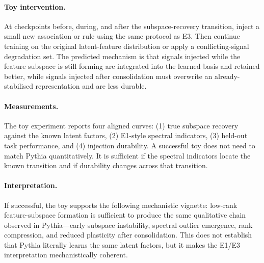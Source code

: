 \paragraph{Toy intervention.}
At checkpoints before, during, and after the subspace-recovery transition, inject a small new association or rule using the same protocol as E3. Then continue training on the original latent-feature distribution or apply a conflicting-signal degradation set. The predicted mechanism is that signals injected while the feature subspace is still forming are integrated into the learned basis and retained better, while signals injected after consolidation must overwrite an already-stabilised representation and are less durable.

\paragraph{Measurements.}
The toy experiment reports four aligned curves: (1) true subspace recovery against the known latent factors, (2) E1-style spectral indicators, (3) held-out task performance, and (4) injection durability. A successful toy does not need to match Pythia quantitatively. It is sufficient if the spectral indicators locate the known transition and if durability changes across that transition.

\paragraph{Interpretation.}
If successful, the toy supports the following mechanistic vignette: low-rank feature-subspace formation is sufficient to produce the same qualitative chain observed in Pythia---early subspace instability, spectral outlier emergence, rank compression, and reduced plasticity after consolidation. This does not establish that Pythia literally learns the same latent factors, but it makes the E1/E3 interpretation mechanistically coherent.

